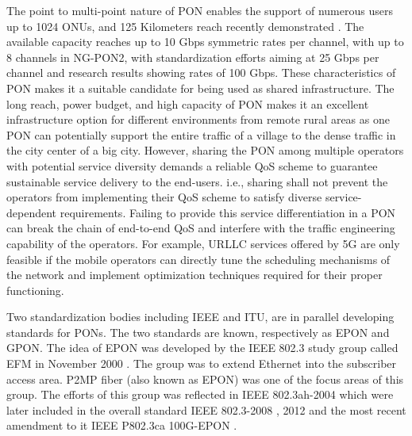 The point to multi-point nature of \ac{PON} enables the support of numerous users up to 1024 \acp{ONU}, and 125 Kilometers reach recently demonstrated \cite{7494070}. The available capacity reaches up to 10 Gbps symmetric rates per channel, with up to 8 channels in NG-PON2, with standardization efforts aiming at 25 Gbps per channel and research results showing rates of 100 Gbps. These characteristics of \ac{PON} makes it a suitable candidate for being used as shared infrastructure. The long reach, power budget, and high capacity of \ac{PON} makes it an excellent infrastructure option for different environments from remote rural areas as one \ac{PON} can potentially support the entire traffic of a village to the dense traffic in the city center of a big city. However, sharing the \ac{PON} among multiple operators with potential service diversity demands a reliable \ac{QoS} scheme to guarantee sustainable service delivery to the end-users. i.e., sharing shall not prevent the operators from implementing their \ac{QoS} scheme to satisfy diverse service-dependent requirements. Failing to provide this service differentiation in a \ac{PON} can break the chain of end-to-end \ac{QoS} and interfere with the traffic engineering capability of the operators. For example, \ac{URLLC} services offered by 5G are only feasible if the mobile operators can directly tune the scheduling mechanisms of the network and implement optimization techniques required for their proper functioning.

Two standardization bodies including \ac{IEEE} and \ac{ITU}, are in parallel developing standards for \acp{PON}. The two standards are known, respectively as \ac{EPON} and \ac{GPON}.
The idea of \ac{EPON} was developed by the \ac{IEEE} 802.3 study group called \ac{EFM} in November 2000 \cite{879000}. The group was to extend Ethernet into the subscriber access area. \ac{P2MP} fiber (also known as \ac{EPON}) was one of the focus areas of this group. The efforts of this group was reflected in \ac{IEEE} 802.3ah-2004 \cite{1337489} which were later included in the overall standard \ac{IEEE} 802.3-2008 \cite{4726971}, 2012 \cite{6419735} and the most recent amendment to it \ac{IEEE} P802.3ca 100G-EPON \cite{100g-epon}.

